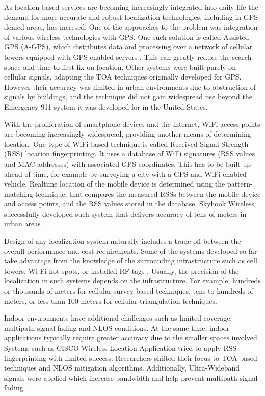 As location-based services are becoming increasingly integrated into daily life  the demand for more accurate and robust localization technologies, including in GPS-denied areas, has incresed. One of the approaches to the problem was integration of various wireless technologies with GPS. One such solution is called Assisted GPS (A-GPS), which distributes data and processing over a network of cellular towers equipped with GPS-enabled servers \cite{AGPS}. This can greatly reduce the search space and time to first fix on location. Other systems were built purely on cellular signals, adapting the TOA techniques originally developed for GPS. However their accuracy was limited in urban environments due to obstruction of signals by buildings, and the technique did not gain widespread use beyond the Emergency-911 system it was developed for in the United States.


With the proliferation of smartphone devices and the internet, WiFi access points are becoming increasingly widespread, providing another means of determining location. One type of WiFi-based technique is called Received Signal Strength (RSS) location fingerprinting. It uses a database of WiFi signatures (RSS values and MAC addresses) with associated GPS coordinates. This has to be built up ahead of time, for example by surveying a city with a GPS and WiFi enabled vehicle. 
Realtime location of the mobile device is determined using the pattern-matching technique, that compares the measured RSSs between the mobile device and access points, and the RSS values stored in the database. Skyhook Wireless successfully developed such system that delivers accuracy of tens of meters in urban areas \cite{Skyhook}. 

Design of any localization system naturally includes a trade-off between the overall performance and cost requirements. Some of the systems developed so far take advantage from the knowledge of the surrounding infrastructure such as
cell towers, Wi-Fi hot spots, or installed RF tags \cite{GeoLoc}. Usually, the precision of the localization in such systems depends on the infrastructure. For example,  hundreds or thousands of meters for cellular survey-based techniques, tens to hundreds of meters, or less than 100 meters for cellular triangulation techniques.


Indoor environments have additional challenges such as limited coverage, multipath signal fading and NLOS conditions. At the same time, indoor applications typically require greater accuracy due to the smaller spaces involved. Systems such as CISCO Wireless Location Application \cite{CiscoWLA} tried to apply RSS fingerprinting with limited success. Researchers shifted their focus to TOA-based techniques and NLOS mitigation algorithms. Additionally, Ultra-Wideband signals were applied which increase bandwidth and help prevent multipath signal fading.

